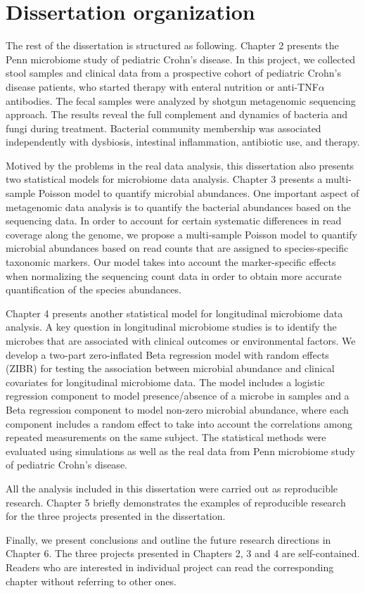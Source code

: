 \section{Dissertation organization }

The rest of the dissertation is structured as following. Chapter 2 presents the Penn microbiome study of pediatric Crohn's disease. In this project, we collected stool samples and clinical data from a prospective cohort of pediatric Crohn's disease patients, who started therapy with enteral nutrition or anti-TNF$\alpha$ antibodies. The fecal samples were analyzed by shotgun metagenomic sequencing approach. The results reveal the full complement and dynamics of bacteria and fungi during treatment. Bacterial community membership was associated independently with dysbiosis, intestinal inflammation, antibiotic use, and therapy.

Motived by the problems in the real data analysis, this dissertation also presents two statistical models for microbiome data analysis. Chapter 3 presents a multi-sample Poisson model to quantify microbial abundances. One important aspect of metagenomic data analysis is to quantify the bacterial abundances based on the sequencing data. In order to account for certain systematic differences in read coverage along the genome, we propose a multi-sample Poisson model to quantify microbial abundances based on read counts that are assigned to species-specific taxonomic markers. Our model takes into account the marker-specific effects when normalizing the sequencing count data in order to obtain more accurate quantification of the species abundances. 

Chapter 4 presents another statistical model  for longitudinal microbiome data analysis. A key question in longitudinal microbiome studies is to identify the microbes that are associated with clinical outcomes or environmental factors. We develop a two-part zero-inflated Beta regression model with random effects (ZIBR) for testing the association between microbial abundance and clinical covariates for longitudinal microbiome data. The model includes a logistic regression component to model presence/absence of a microbe in samples and a Beta regression component to model non-zero microbial abundance, where each component includes a random effect to take into account the correlations among repeated measurements on the same subject. The statistical methods were evaluated using simulations as well as the real data from Penn microbiome study of pediatric Crohn's disease.

All the analysis included in this dissertation were carried out as reproducible research. Chapter 5 briefly demonstrates the examples of reproducible research for the three projects presented in the dissertation.

Finally, we present conclusions and outline the future research directions in Chapter 6. The three projects presented in Chapters 2, 3 and 4 are self-contained. Readers who are interested in individual project can read the corresponding chapter without referring to other ones.
